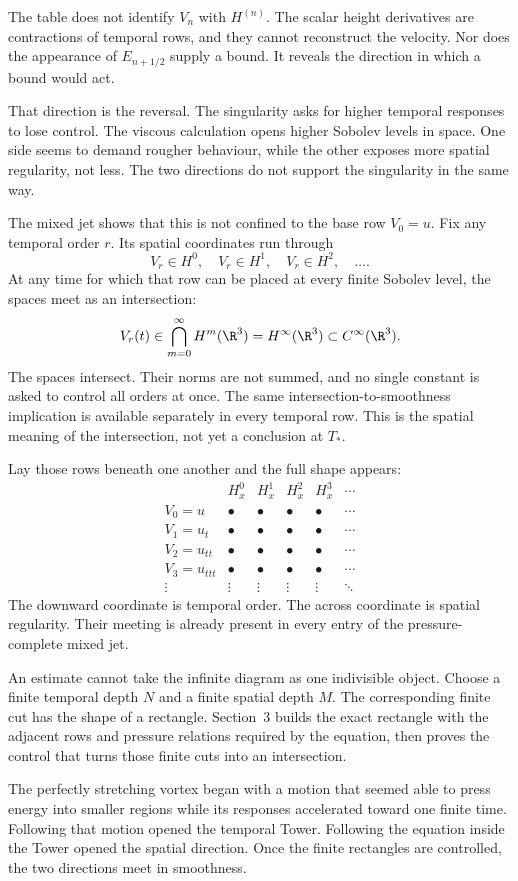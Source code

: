 The table does not identify \(V_n\) with \(H^{(n)}\).
The scalar height derivatives are contractions of temporal rows, and they cannot reconstruct the velocity.
Nor does the appearance of \(E_{n+1/2}\) supply a bound.
It reveals the direction in which a bound would act.

That direction is the reversal.
The singularity asks for higher temporal responses to lose control.
The viscous calculation opens higher Sobolev levels in space.
One side seems to demand rougher behaviour, while the other exposes more spatial regularity, not less.
The two directions do not support the singularity in the same way.

The mixed jet shows that this is not confined to the base row \(V_0=u\).
Fix any temporal order \(r\).
Its spatial coordinates run through
\[
  V_r\in H^0,\quad
  V_r\in H^1,\quad
  V_r\in H^2,\quad
  \ldots.
\]
At any time for which that row can be placed at every finite Sobolev level, the spaces meet as an intersection:
\[
  V_r(t)
  \in
  \bigcap_{m=0}^{\infty}H^m(\R^3)
  =
  H^\infty(\R^3)
  \subset
  C^\infty(\R^3).
\]
The spaces intersect.
Their norms are not summed, and no single constant is asked to control all orders at once.
The same intersection-to-smoothness implication is available separately in every temporal row.
This is the spatial meaning of the intersection, not yet a conclusion at \(T_*\).

Lay those rows beneath one another and the full shape appears:
\[
\begin{array}{c|ccccc}
 & H^0_x & H^1_x & H^2_x & H^3_x & \cdots\\
\hline
V_0=u      & \bullet & \bullet & \bullet & \bullet & \cdots\\
V_1=u_t    & \bullet & \bullet & \bullet & \bullet & \cdots\\
V_2=u_{tt} & \bullet & \bullet & \bullet & \bullet & \cdots\\
V_3=u_{ttt}& \bullet & \bullet & \bullet & \bullet & \cdots\\
\vdots     & \vdots  & \vdots  & \vdots  & \vdots  & \ddots
\end{array}
\]
The downward coordinate is temporal order.
The across coordinate is spatial regularity.
Their meeting is already present in every entry of the pressure-complete mixed jet.

An estimate cannot take the infinite diagram as one indivisible object.
Choose a finite temporal depth \(N\) and a finite spatial depth \(M\).
The corresponding finite cut has the shape of a rectangle.
Section~3 builds the exact rectangle with the adjacent rows and pressure relations required by the equation, then proves the control that turns those finite cuts into an intersection.

The perfectly stretching vortex began with a motion that seemed able to press energy into smaller regions while its responses accelerated toward one finite time.
Following that motion opened the temporal Tower.
Following the equation inside the Tower opened the spatial direction.
Once the finite rectangles are controlled, the two directions meet in smoothness.
